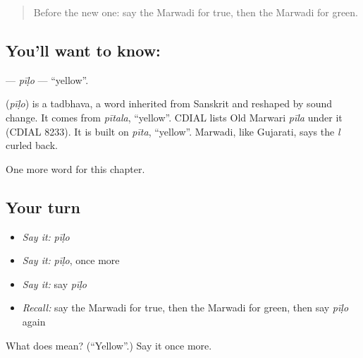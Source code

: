 \label{lesson:MW-C76-pilo}



\begin{quote}
Before the new one: say the Marwadi for true, then the Marwadi for green.
\end{quote}

\subsection*{You'll want to know: }
\textbf{} — \emph{pīḷo} — \textquotedblleft{}yellow\textquotedblright{}.

\begin{cousinweb}
\textbf{} (\emph{pīḷo}) is a tadbhava, a word inherited from Sanskrit and reshaped by sound change. It comes from \emph{pītala}, \textquotedblleft{}yellow\textquotedblright{}. CDIAL lists Old Marwari \emph{pīla} under it (CDIAL 8233). It is built on \emph{pīta}, \textquotedblleft{}yellow\textquotedblright{}. Marwadi, like Gujarati, says the \emph{l} curled back.
\end{cousinweb}

\begin{grammarlens}[title={What you've built}]
One more word for this chapter.
\end{grammarlens}

\subsection*{Your turn}
\begin{itemize}
\raggedright
  \item \emph{Say it:} \emph{pīḷo}
  \item \emph{Say it:} \emph{pīḷo}, once more
  \item \emph{Say it:} say \emph{pīḷo}
  \item \emph{Recall:} say the Marwadi for true, then the Marwadi for green, then say \emph{pīḷo} again
\end{itemize}

\begin{tcolorbox}[breakable,colback=teal!4,colframe=teal!35!black,title={Before you move on}]
What does  mean? (\textquotedblleft{}Yellow\textquotedblright{}.) Say it once more.
\end{tcolorbox}
